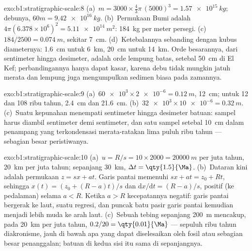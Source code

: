 \begin{solution}{exo:b1:stratigraphic-scale:8}
(a)~$m = 3000 \times \frac43\pi\,(5000)^3 = \qty{1.57e15}{kg}$; debunya,
$60m = \qty{9.42e16}{kg}$. (b)~Permukaan Bumi adalah $4\pi(6.378\times10^6)^2
= \qty{5.11e14}{m^2}$: \qty{184}{kg} per meter persegi. (c)~$184/2500 =
\qty{0.074}{m}$, sekitar \qty{7}{cm}. (d)~Ketebalannya sebanding dengan kubus diameternya:
\qty{1.6}{cm} untuk \qty{6}{km}, \qty{20}{cm} untuk \qty{14}{km}. Orde besarannya, dari
sentimeter hingga desimeter, adalah orde lempung batas, setebal \qty{50}{cm} di El Kef;
perbandingannya hanya dapat kasar, karena debu tidak mungkin jatuh merata dan lempung
juga mengumpulkan sedimen biasa pada zamannya.
\end{solution}

\begin{solution}{exo:b1:stratigraphic-scale:9}
(a)~$\num{60e3} \times \num{2e-6} = \qty{0.12}{m}$, \qty{12}{cm}; untuk 12 dan 108 ribu
tahun, \qty{2.4}{cm} dan \qty{21.6}{cm}. (b)~$\num{32e3} \times
\num{10e-6} = \qty{0.32}{m}$. (c)~Suatu kepunahan menempati sentimeter hingga desimeter
batuan: sampel harus diambil sentimeter demi sentimeter, dan satu sampel setebal
\qty{10}{cm} dalam penampang yang terkondensasi merata-ratakan lima puluh ribu tahun ---
sebagian besar peristiwanya.
\end{solution}

\begin{solution}{exo:b1:stratigraphic-scale:10}
(a)~$u = R/s = 10 \times 2000 = \qty{20000}{m}$ per juta tahun,
\qty{20}{km} per juta tahun; sepanjang \qty{30}{km}, $\Delta t = \qty{1.5}{\Ma}$.
(b)~Dataran kini adalah permukaan $z = s x + a t$. Garis pantai memenuhi
$s x + a t = z_0 + R t$, sehingga $x(t) = (z_0 + (R - a)t)/s$ dan
$\mathrm dx/\mathrm dt = (R - a)/s$, positif (ke pedalaman) selama $a < R$. Ketika
$a > R$ kecepatannya negatif: garis pantai bergerak ke laut, suatu regresi, dan puncak
batu pasir garis pantai kemudian menjadi lebih muda ke arah laut. (c)~Sebuah tebing
sepanjang \qty{200}{m} mencakup, pada \qty{20}{km} per juta tahun, $0.2/20 = \qty{0.01}{\Ma}$
--- sepuluh ribu tahun diakronisme, jauh di bawah apa yang dapat diselesaikan oleh fosil
atau sebagian besar penanggalan; batuan di kedua sisi  itu sama di sepanjangnya.
\end{solution}

